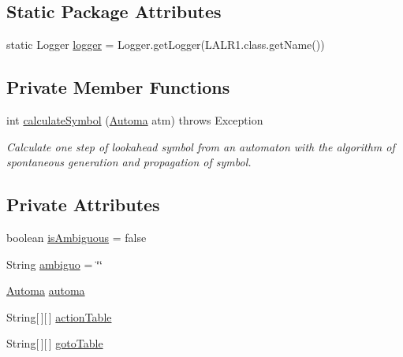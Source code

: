 \subsection*{Static Package Attributes}
\begin{DoxyCompactItemize}
\item 
static Logger \hyperlink{classcontext_free_1_1parser_1_1_l_a_l_r1_a9684757c9b143a5b82609c1de472400e}{logger} = Logger.\-get\-Logger(L\-A\-L\-R1.\-class.\-get\-Name())
\end{DoxyCompactItemize}
\subsection*{Private Member Functions}
\begin{DoxyCompactItemize}
\item 
int \hyperlink{classcontext_free_1_1parser_1_1_l_a_l_r1_aeec32b5c83e031225114f46ac377f804}{calculate\-Symbol} (\hyperlink{classcontext_free_1_1parser_1_1_automa}{Automa} atm)  throws Exception
\begin{DoxyCompactList}\small\item\em Calculate one step of lookahead symbol from an automaton with the algorithm of spontaneous generation and propagation of symbol. \end{DoxyCompactList}\end{DoxyCompactItemize}
\subsection*{Private Attributes}
\begin{DoxyCompactItemize}
\item 
boolean \hyperlink{classcontext_free_1_1parser_1_1_l_a_l_r1_a3e69dd16d8b89cc9a210286efe0aa0d8}{is\-Ambiguous} = false
\item 
String \hyperlink{classcontext_free_1_1parser_1_1_l_a_l_r1_ac76b78ae26e1f59674ae10b9c1059213}{ambiguo} = \char`\"{}\char`\"{}
\item 
\hyperlink{classcontext_free_1_1parser_1_1_automa}{Automa} \hyperlink{classcontext_free_1_1parser_1_1_l_a_l_r1_ab6054628eaec08e8b3b77a37e219ef02}{automa}
\item 
String\mbox{[}$\,$\mbox{]}\mbox{[}$\,$\mbox{]} \hyperlink{classcontext_free_1_1parser_1_1_l_a_l_r1_a50a59810900d20102a28766aad917b79}{action\-Table}
\item 
String\mbox{[}$\,$\mbox{]}\mbox{[}$\,$\mbox{]} \hyperlink{classcontext_free_1_1parser_1_1_l_a_l_r1_a6f27da8ba10ef81be36845b0fffc9858}{goto\-Table}
\end{DoxyCompactItemize}


